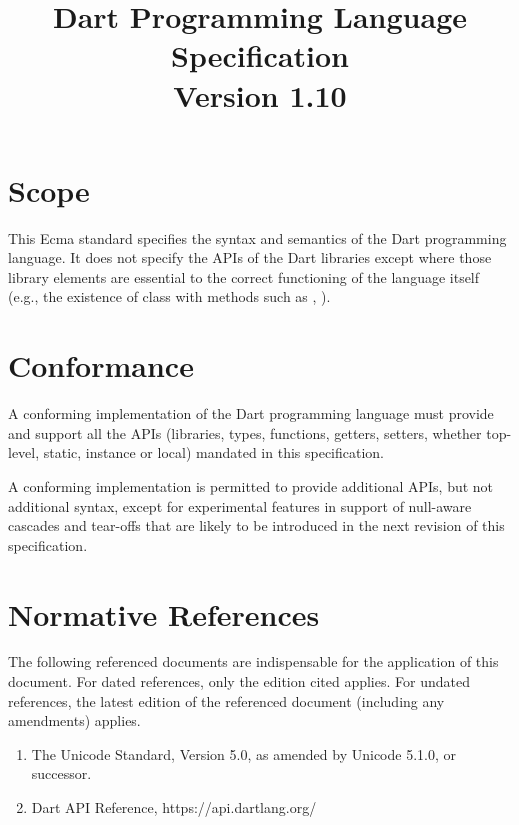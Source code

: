 \documentclass{article}
\title{Dart Programming Language  Specification \\
{\large Version 1.10}}
\begin{document}
\maketitle
\tableofcontents


\newpage

\pagestyle{myheadings}

\section{Scope}

\LMHash{}
This Ecma standard specifies the syntax and semantics of the Dart programming language.  It does not specify the APIs of the Dart libraries except where those library elements are essential to the correct functioning of the language itself (e.g., the existence of class  with methods such as , ).

\section{Conformance}

\LMHash{}
A conforming  implementation of the Dart programming language must provide and support all the  APIs (libraries, types, functions, getters, setters, whether top-level, static, instance or local) mandated in this specification. 

\LMHash{}
A conforming implementation is permitted to provide additional APIs, but not additional syntax, except for experimental features in support of null-aware cascades and tear-offs that are likely to be introduced in the next revision of this specification.

\section{Normative References}

\LMHash{}
The following referenced documents are indispensable for the application of this document. For dated references, only the edition cited applies. For undated references, the latest edition of the referenced document (including any amendments) applies.

\begin{enumerate}
\item
The Unicode Standard, Version 5.0, as amended by Unicode 5.1.0, or successor.
\item
Dart API Reference, https://api.dartlang.org/
\end{enumerate}
\end{document}
